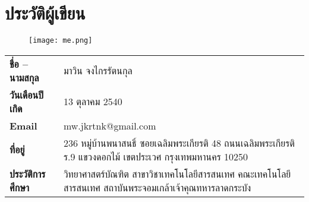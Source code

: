 \chapter{ประวัติผู้เขียน}

\begin{figure}[!h]
	\centering
	\texttt{[image: me.png]}
	\label{Fig:me}
\end{figure}

\begin{table}[h]
	\begin{tabularx}{\linewidth}{lX}
		\textbf{ชื่อ – นามสกุล} & มาวิน จงไกรรัตนกุล \\
		\textbf{วันเดือนปีเกิด} & 13 ตุลาคม 2540 \\
		\textbf{Email} & mw.jkrtnk@gmail.com \\
		\textbf{ที่อยู่} & 236 หมู่บ้านพนาสนธิ์ ซอยเฉลิมพระเกียรติ 48 ถนนเฉลิมพระเกียรติ ร.9 แขวงดอกไม้ เขตประเวศ กรุงเทพมหานคร 10250 \\
		\textbf{ประวัติการศึกษา} & วิทยาศาสตร์​บัณฑิต สาขาวิชาเทคโนโลยีสารสนเทศ คณะเทคโนโลยีสารสนเทศ สถาบันพระจอมเกล้าเจ้าคุณทหารลาดกระบัง \\
	\end{tabularx}
\end{table}